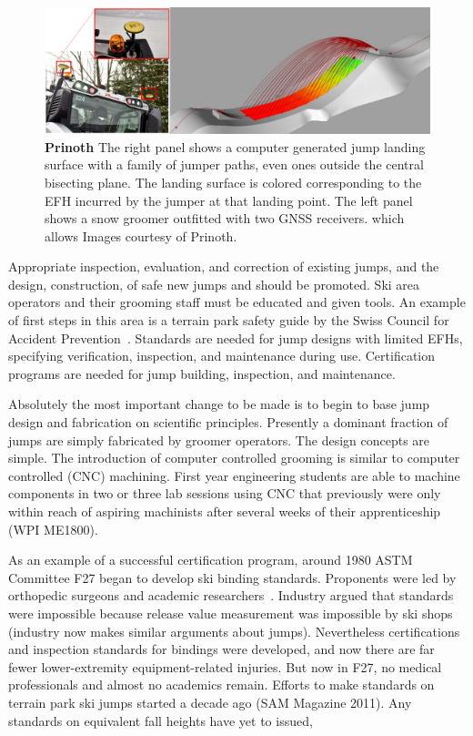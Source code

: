\documentclass[smallextended]{svjour3}       %
\begin{document}
%
\begin{figure}
  \centering
  \includegraphics[width=\columnwidth]{figures/prinoth.png}
  \caption{\textbf{Prinoth} The right panel shows a computer generated jump landing surface with a family of jumper paths, even ones outside the central bisecting plane. The landing surface is colored corresponding to the EFH incurred by the jumper at that landing point. The left panel shows a snow groomer outfitted with two GNSS receivers.  which allows  
  Images courtesy of Prinoth.}
  \label{fig:prinoth}
\end{figure}

Appropriate inspection, evaluation, and correction of existing jumps, and the design, construction, of safe new jumps and should be promoted. Ski area
operators and their grooming staff must be educated and given tools. An example
of first steps in this area is a terrain park safety guide by the Swiss Council for Accident Prevention~\cite{Heer2019}. Standards are needed for jump
designs with limited EFHs, specifying verification, inspection, and maintenance
during use. Certification programs are needed for jump building, inspection,
and maintenance.

Absolutely the most important change to be made is to begin to base jump design and fabrication on scientific principles. Presently a dominant fraction of jumps are simply fabricated by groomer operators.  The design concepts are simple. The introduction of computer controlled grooming is similar to computer controlled (CNC) machining. First year engineering students are able to machine components in two or three lab sessions using CNC that previously were only within reach of aspiring machinists after several weeks of their apprenticeship (WPI ME1800).

As an example of a successful certification program, around 1980 ASTM Committee
F27 began to develop ski binding standards. Proponents were led by orthopedic
surgeons and academic researchers~\cite{Bahniuk1996}. Industry argued that
standards were impossible because release value measurement was impossible by
ski shops (industry now makes similar arguments about jumps). Nevertheless
certifications and inspection standards for bindings were developed, and now
there are far fewer lower-extremity equipment-related injuries. But now in F27,
no medical professionals and almost no academics remain. Efforts to make standards on terrain park ski jumps started a decade ago (SAM Magazine 2011). Any standards on equivalent fall heights have yet to issued,
\end{document}
